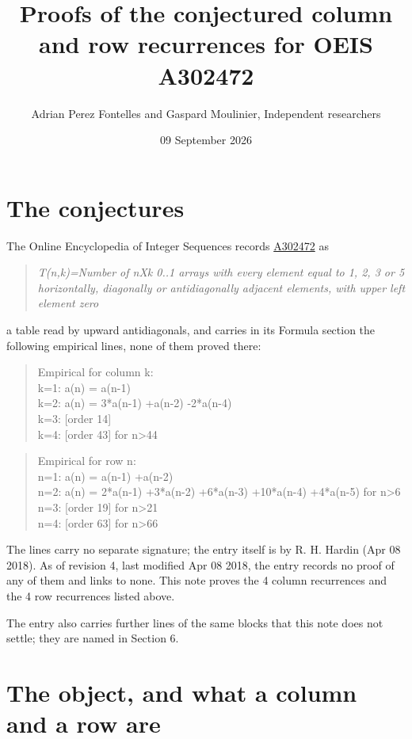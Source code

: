 \documentclass[11pt]{article}
\title{Proofs of the conjectured column and row recurrences for OEIS A302472}
\author{Adrian Perez Fontelles and Gaspard Moulinier, Independent researchers}
\date{09 September 2026}
\theoremstyle{definition}
\begin{document}
\maketitle
\section{The conjectures}

The Online Encyclopedia of Integer Sequences records \href{https://oeis.org/A302472}{A302472} as

\begin{quote}\itshape T(n,k)=Number of nXk 0..1 arrays with every element equal to 1, 2, 3 or 5 horizontally, diagonally or antidiagonally adjacent elements, with upper left element zero\end{quote}

a table read by upward antidiagonals, and carries in its Formula section the following empirical lines, none of them proved there:

\begin{quote}\ttfamily Empirical for column k:\\
k=1: a(n) = a(n-1)\\k=2: a(n) = 3*a(n-1) +a(n-2) -2*a(n-4)\\k=3: [order 14]\\k=4: [order 43] for n>44\end{quote}

\begin{quote}\ttfamily Empirical for row n:\\
n=1: a(n) = a(n-1) +a(n-2)\\n=2: a(n) = 2*a(n-1) +3*a(n-2) +6*a(n-3) +10*a(n-4) +4*a(n-5) for n>6\\n=3: [order 19] for n>21\\n=4: [order 63] for n>66\end{quote}

The lines carry no separate signature; the entry itself is by R. H. Hardin (Apr 08 2018). As of revision 4, last modified Apr 08 2018, the entry records no proof of any of them and links to none. This note proves the 4 column recurrences and the 4 row recurrences listed above.

The entry also carries further lines of the same blocks that this note does not settle; they are named in Section 6.

\section{The object, and what a column and a row are}
\end{document}
